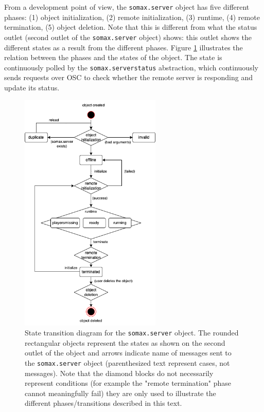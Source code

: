 From a development point of view, the \texttt{somax.server} object has five different phases: (1) object initialization, (2) remote initialization, (3) runtime, (4) remote termination, (5) object deletion. Note that this is different from what the status outlet (second outlet of the \texttt{somax.server} object) shows: this outlet shows the different states as a result from the different phases. Figure \ref{fig:3-server-states} illustrates the relation between the phases and the states of the object. The state is continuously polled by the \texttt{somax.serverstatus} abstraction, which continuously sends requests over OSC to check whether the remote server is responding and update its status.

 \begin{figure}[h!]
    \centering        
 	\includegraphics[width=0.6\textwidth, keepaspectratio]{figures/server_state.png}
    \caption{State transition diagram for the \texttt{somax.server} object. The rounded rectangular objects represent the states as shown on the second outlet of the object and arrows indicate name of messages sent to the \texttt{somax.server} object (parenthesized text represent cases, not messages). Note that the diamond blocks do not necessarily represent conditions (for example the "remote termination" phase cannot meaningfully fail) they are only used to illustrate the different phases/transitions described in this text.} 
    \label{fig:3-server-states}
\end{figure}

